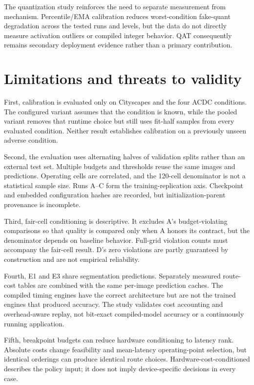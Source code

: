 \documentclass[a4paper,review,12pt]{elsarticle}
\begin{document}
The quantization study reinforces the need to separate measurement from mechanism. Percentile/EMA calibration reduces worst-condition fake-quant degradation across the tested runs and levels, but the data do not directly measure activation outliers or compiled integer behavior. QAT consequently remains secondary deployment evidence rather than a primary contribution.

\section{Limitations and threats to validity}
\label{sec:limitations}

First, calibration is evaluated only on Cityscapes and the four ACDC conditions. The configured variant assumes that the condition is known, while the pooled variant removes that runtime choice but still uses fit-half samples from every evaluated condition. Neither result establishes calibration on a previously unseen adverse condition.

Second, the evaluation uses alternating halves of validation splits rather than an external test set. Multiple budgets and thresholds reuse the same images and predictions. Operating cells are correlated, and the 120-cell denominator is not a statistical sample size. Runs A--C form the training-replication axis. Checkpoint and embedded configuration hashes are recorded, but initialization-parent provenance is incomplete.

Third, fair-cell conditioning is descriptive. It excludes A's budget-violating comparisons so that quality is compared only when A honors its contract, but the denominator depends on baseline behavior. Full-grid violation counts must accompany the fair-cell result. D's zero violations are partly guaranteed by construction and are not empirical reliability.

Fourth, E1 and E3 share segmentation predictions. Separately measured route-cost tables are combined with the same per-image prediction caches. The compiled timing engines have the correct architecture but are not the trained engines that produced accuracy. The study validates cost accounting and overhead-aware replay, not bit-exact compiled-model accuracy or a continuously running application.

Fifth, breakpoint budgets can reduce hardware conditioning to latency rank. Absolute costs change feasibility and mean-latency operating-point selection, but identical orderings can produce identical route choices. Hardware-cost-conditioned describes the policy input; it does not imply device-specific decisions in every case.
\end{document}
